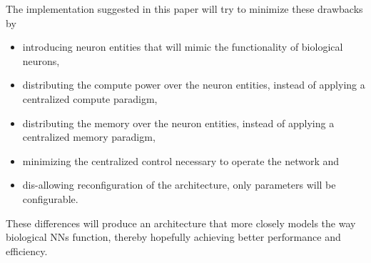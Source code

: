 The implementation suggested in this paper will try to minimize these drawbacks by
\begin{itemize}
  \item introducing neuron entities that will mimic the functionality of biological neurons,
  \item distributing the compute power over the neuron entities, instead of applying a centralized compute paradigm,
  \item distributing the memory over the neuron entities, instead of applying a centralized memory paradigm,
  \item minimizing the centralized control necessary to operate the network and
  \item dis-allowing reconfiguration of the architecture, only parameters will be configurable.
\end{itemize}
These differences will produce an architecture that more closely models the way biological \acp{NN} function, thereby hopefully achieving better performance and efficiency.
